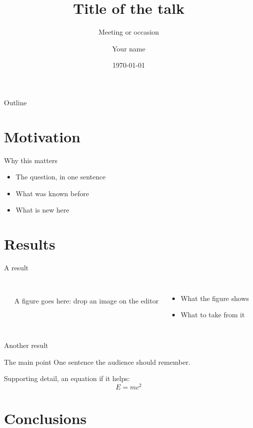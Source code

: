 \documentclass[aspectratio=169]{beamer}
\title{Title of the talk}
\subtitle{Meeting or occasion}
\author{Your name}
\institute{Your institution}
\date{\today}
\begin{document}
\begin{frame}[plain]
	\titlepage
\end{frame}

\begin{frame}{Outline}
	\tableofcontents
\end{frame}

\section{Motivation}

\begin{frame}{Why this matters}
	\begin{itemize}
		\item<1-> The question, in one sentence
		\item<2-> What was known before
		\item<3-> What is new here
	\end{itemize}
\end{frame}

\section{Results}

\begin{frame}{A result}
	\begin{columns}[c]
		\centering
		\rule{0.9\linewidth}{0.55\linewidth}\\[1mm]
		{\small A figure goes here: drop an image on the editor}
		\begin{itemize}
			\item What the figure shows
			\item What to take from it
		\end{itemize}
	\end{columns}
\end{frame}

\begin{frame}{Another result}
	\begin{block}{The main point}
		One sentence the audience should remember.
	\end{block}
	\vspace{4mm}
	Supporting detail, an equation if it helps:
	\[ E = mc^2 \]
\end{frame}

\section{Conclusions}
\end{document}
